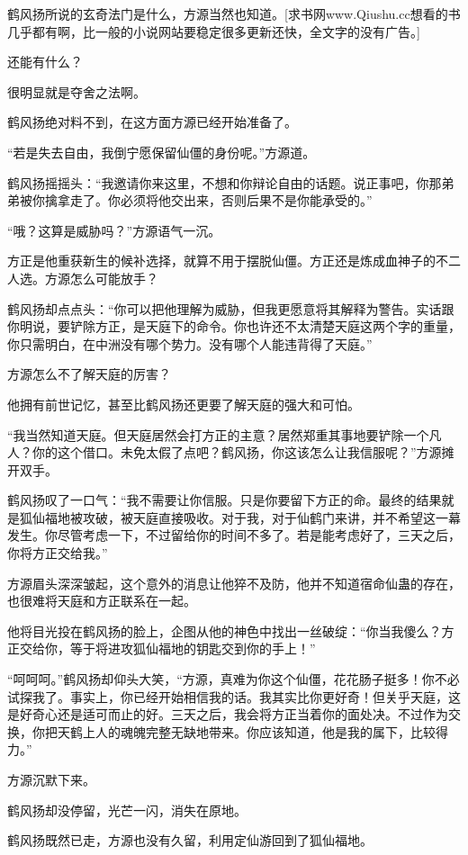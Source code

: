 \begin{this_body}
鹤风扬所说的玄奇法门是什么，方源当然也知道。[求书网www.Qiushu.cc想看的书几乎都有啊，比一般的小说网站要稳定很多更新还快，全文字的没有广告。]

还能有什么？

很明显就是夺舍之法啊。

鹤风扬绝对料不到，在这方面方源已经开始准备了。

“若是失去自由，我倒宁愿保留仙僵的身份呢。”方源道。

鹤风扬摇摇头：“我邀请你来这里，不想和你辩论自由的话题。说正事吧，你那弟弟被你擒拿走了。你必须将他交出来，否则后果不是你能承受的。”

“哦？这算是威胁吗？”方源语气一沉。

方正是他重获新生的候补选择，就算不用于摆脱仙僵。方正还是炼成血神子的不二人选。方源怎么可能放手？

鹤风扬却点点头：“你可以把他理解为威胁，但我更愿意将其解释为警告。实话跟你明说，要铲除方正，是天庭下的命令。你也许还不太清楚天庭这两个字的重量，你只需明白，在中洲没有哪个势力。没有哪个人能违背得了天庭。”

方源怎么不了解天庭的厉害？

他拥有前世记忆，甚至比鹤风扬还更要了解天庭的强大和可怕。

“我当然知道天庭。但天庭居然会打方正的主意？居然郑重其事地要铲除一个凡人？你的这个借口。未免太假了点吧？鹤风扬，你这该怎么让我信服呢？”方源摊开双手。

鹤风扬叹了一口气：“我不需要让你信服。只是你要留下方正的命。最终的结果就是狐仙福地被攻破，被天庭直接吸收。对于我，对于仙鹤门来讲，并不希望这一幕发生。你尽管考虑一下，不过留给你的时间不多了。若是能考虑好了，三天之后，你将方正交给我。”

方源眉头深深皱起，这个意外的消息让他猝不及防，他并不知道宿命仙蛊的存在，也很难将天庭和方正联系在一起。

他将目光投在鹤风扬的脸上，企图从他的神色中找出一丝破绽：“你当我傻么？方正交给你，等于将进攻狐仙福地的钥匙交到你的手上！”

“呵呵呵。”鹤风扬却仰头大笑，“方源，真难为你这个仙僵，花花肠子挺多！你不必试探我了。事实上，你已经开始相信我的话。我其实比你更好奇！但关乎天庭，这是好奇心还是适可而止的好。三天之后，我会将方正当着你的面处决。不过作为交换，你把天鹤上人的魂魄完整无缺地带来。你应该知道，他是我的属下，比较得力。”

方源沉默下来。

鹤风扬却没停留，光芒一闪，消失在原地。

鹤风扬既然已走，方源也没有久留，利用定仙游回到了狐仙福地。


\end{this_body}
